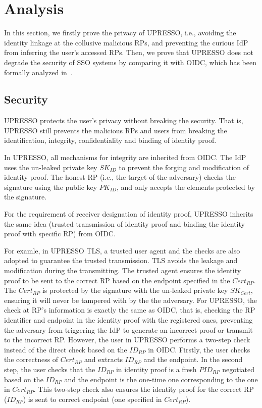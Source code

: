 \section{Analysis}
\label{sec:analysis}
In this section, we firstly prove the privacy of UPRESSO, i.e., avoiding the identity linkage at the collusive malicious RPs,
and preventing the curious IdP from inferring the user's accessed RPs.
Then, we prove that UPRESSO does not degrade the security of SSO systems by comparing it with OIDC, which has been formally analyzed in~\cite{FettKS17}.


\subsection{Security}
\label{subsec:security}
UPRESSO protects the user's privacy without breaking the security. That is, UPRESSO still prevents the malicious RPs and users from breaking the identification, integrity, confidentiality and binding of identity proof.

In UPRESSO, all mechanisms for integrity are inherited from OIDC. The IdP uses the un-leaked private key $SK_{ID}$ to prevent the forging and modification of identity proof. The honest RP (i.e., the target of the adversary) checks the signature using the public key $PK_{ID}$, and only accepts the elements protected by the signature.

For the requirement of receiver designation of identity proof, UPRESSO inherits the same idea (trusted transmission of identity proof and binding the identity proof with specific RP) from OIDC.

For examle, in UPRESSO TLS, a trusted user agent and the checks are also adopted to guarantee the trusted transmission. TLS avoids the leakage and modification during the transmitting. The trusted agent ensures the identity proof to be sent to the correct RP based on the endpoint specified in the $Cert_{RP}$. The  $Cert_{RP}$ is protected by the signature with the un-leaked private key $SK_{Cert}$, ensuring it  will never be tampered with by the the adversary. For UPRESSO, the check at RP's information is exactly the same as OIDC, that is, checking the RP identifier and endpoint in the identity proof with the registered ones, preventing the adversary from triggering the IdP to
generate an incorrect proof or transmit to the incorrect RP. However, the user in UPRESSO performs a two-step check instead of the direct check based on the $ID_{RP}$ in OIDC. Firstly, the user checks the correctness of $Cert_{RP}$ and extracts  $ID_{RP}$ and the endpoint. In the second step, the user checks that the $ID_{RP}$ in identity proof is a fresh $PID_{RP}$ negotiated based on the $ID_{RP}$ and the endpoint is the one-time one corresponding to the one in $Cert_{RP}$. This two-step check also ensures the identity proof for the correct RP ($ID_{RP}$) is sent to correct endpoint (one specified in $Cert_{RP}$).

